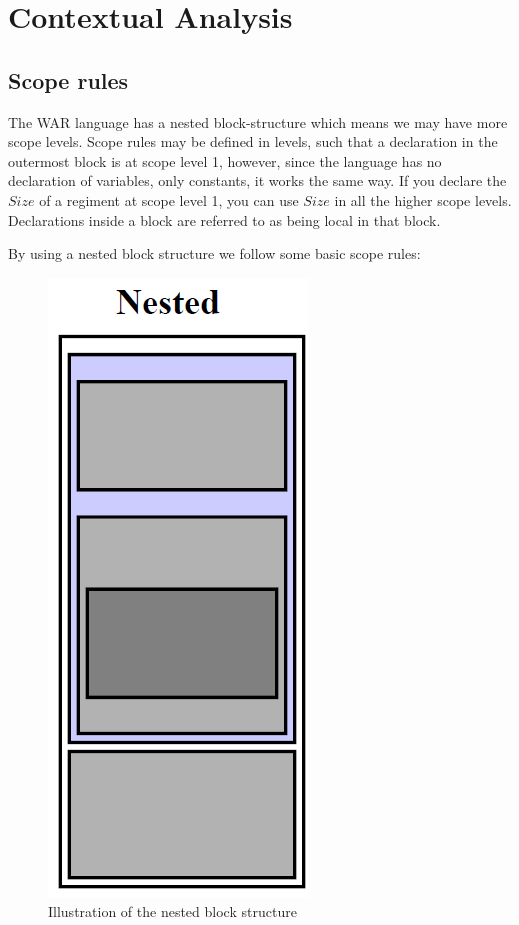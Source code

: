 \section{Contextual Analysis}

	\subsection{Scope rules}
	The WAR language has a nested block-structure which means we may have more scope levels. Scope rules may be defined in levels, such that a declaration in the outermost block is at scope level 1, however, since the language has no declaration of variables, only constants, it works the same way. If you declare the $Size$ of a regiment at scope level 1, you can use $Size$ in all the higher scope levels. Declarations inside a block are referred to as being local in that block.

	By using a nested block structure we follow some basic scope rules:
	\begin{figure}
		\begin{center}
			\includegraphics[scale=0.5]{rapport/5/figures/nested_block_structure}
		\end{center}	
		\caption{Illustration of the nested block structure}
		\label{nested_block_structure}
	\end{figure}


